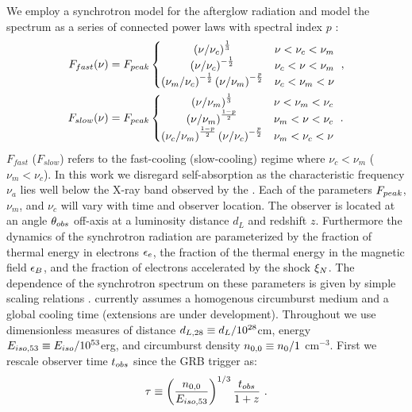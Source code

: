 We employ a synchrotron model for the afterglow radiation and model the spectrum as a series of connected power laws with spectral index $p$ \citep{Sari98}:
\begin{align} \eqlabel{spectrum}
	F_{fast}(\nu) &= \Fp \left \{ \begin{matrix}  \left(\nu / \nu_c\right)^\frac{1}{3} & \nu < \nu_c < \nu_m \\
								 \left(\nu / \nu_c\right)^{-\frac{1}{2}} & \nu_c < \nu < \nu_m \\
								 \left(\nu_m / \nu_c\right)^{-\frac{1}{2}} \left( \nu / \nu_m \right)^{-\frac{p}{2}} & \nu_c < \nu_m < \nu  \end{matrix}  \right . \ ,  \\
	F_{slow}(\nu) &= \Fp \left \{ \begin{matrix}  \left(\nu / \nu_m\right)^\frac{1}{3} & \nu < \nu_m < \nu_c \\
								\left(\nu / \nu_m\right)^{\frac{1-p}{2}} & \nu_m < \nu < \nu_c \\
								\left(\nu_c / \nu_m\right)^{\frac{1-p}{2}} \left( \nu / \nu_c \right)^{-\frac{p}{2}} & \nu_m < \nu_c < \nu \end{matrix}  \right . \ .
\end{align}
$F_{fast}$ ($F_{slow}$) refers to the fast-cooling (slow-cooling) regime where $\nu_c < \nu_m$ ($\nu_m < \nu_c$).  In this work we disregard self-absorption as the characteristic frequency $\nu_a$ lies well below the X-ray band observed by the \swiftXRT{}.  Each of the parameters $F_{peak}$, $\nu_m$, and $\nu_c$ will vary with time and observer location.  The observer is located at an angle $\theta_{obs}$ off-axis at a luminosity distance $d_L$ and redshift $z$.  Furthermore the dynamics of the synchrotron radiation are parameterized by the fraction of thermal energy in electrons $\epsilon_e$, the fraction of the thermal energy in the magnetic field $\epsilon_B$, and the fraction of electrons accelerated by the shock $\xi_N$.  The dependence of the synchrotron spectrum on these parameters is given by simple scaling relations \citep{vanEer12scale}.  \scalefit{} currently assumes a homogenous circumburst medium and a global cooling time (extensions are under development).  Throughout we use dimensionless measures of distance $d_{L,28} \equiv d_L / 10^{28} $cm, energy $E_{iso, 53} \equiv E_{iso} / 10^{53}$erg, and circumburst density $\ndl \equiv n_0/1\ $cm$^{-3}$.  First we rescale observer time $t_{obs}$ since the GRB trigger as:
 \begin{equation}\eqlabel{rescale}
	\tau \equiv \left( \frac{\ndl}{\Edl}\right)^{1/3} \frac{t_{obs}}{1+z} \ .  
\end{equation}
